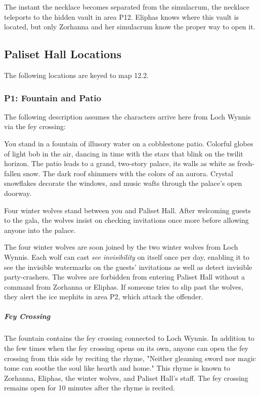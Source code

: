 \documentclass[10pt,a4paper,twoside,bg=print,twocolumn,openany,nodeprecatedcode]{dndbook}
\begin{document}
The instant the necklace becomes separated from the simulacrum, the necklace teleports to the hidden vault in area P12. Eliphas knows where this vault is located, but only Zorhanna and her simulacrum know the proper way to open it.

\subsection{Paliset Hall Locations}
The following locations are keyed to map 12.2.

\subsubsection{P1: Fountain and Patio}
The following description assumes the characters arrive here from Loch Wynnis via the fey crossing:

\begin{DndReadAloud}{}
You stand in a fountain of illusory water on a cobblestone patio. Colorful globes of light bob in the air, dancing in time with the stars that blink on the twilit horizon. The patio leads to a grand, two-story palace, its walls as white as fresh-fallen snow. The dark roof shimmers with the colors of an aurora. Crystal snowflakes decorate the windows, and music wafts through the palace's open doorway.

Four winter wolves stand between you and Paliset Hall. After welcoming guests to the gala, the wolves insist on checking invitations once more before allowing anyone into the palace.

\end{DndReadAloud}

The four winter wolves are soon joined by the two winter wolves from Loch Wynnis. Each wolf can cast \textit{see invisibility} on itself once per day, enabling it to see the invisible watermarks on the guests' invitations as well as detect invisible party-crashers. The wolves are forbidden from entering Paliset Hall without a command from Zorhanna or Eliphas. If someone tries to slip past the wolves, they alert the ice mephits in area P2, which attack the offender.

\subparagraph{Fey Crossing}
The fountain contains the fey crossing connected to Loch Wynnis. In addition to the few times when the fey crossing opens on its own, anyone can open the fey crossing from this side by reciting the rhyme, "Neither gleaming sword nor magic tome can soothe the soul like hearth and home." This rhyme is known to Zorhanna, Eliphas, the winter wolves, and Paliset Hall's staff. The fey crossing remains open for 10 minutes after the rhyme is recited.
\end{document}
